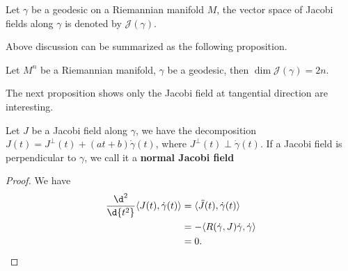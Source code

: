 \begin{symb}
    Let $\gamma$ be a geodesic on a Riemannian manifold $M$, the vector space of Jacobi fields along $\gamma$ is denoted by $\mathscr{J}(\gamma)$.
\end{symb}

Above discussion can be summarized as the following proposition.

\begin{prop}
    Let $M^n$ be a Riemannian manifold, $\gamma$ be a geodesic, then $\dim\mathscr{J}(\gamma)=2n$.
\end{prop}

The next proposition shows only the Jacobi field at tangential direction are interesting.
\begin{prop}\label{decomposition of Jacobi fields}
    Let $J$ be a Jacobi field along $\gamma$, we have the decomposition $J(t)=J^\perp(t)+(at+b)\dot{\gamma}(t)$, where $J^\perp(t)\perp\dot{\gamma}(t)$.
    If a Jacobi field is perpendicular to $\gamma$, we call it a \textbf{normal Jacobi field}
\end{prop}
\begin{proof}
    We have
    \begin{align*}
        \frac{\d^2{}}{\d{t^2}}\langle J(t),\dot{\gamma}(t)\rangle&=\langle\ddot{J}(t),\dot{\gamma}(t)\rangle\\
        &=-\langle R(\dot{\gamma},J)\dot{\gamma},\dot{\gamma}\rangle\\
        &=0.\qedhere
    \end{align*}
\end{proof}

